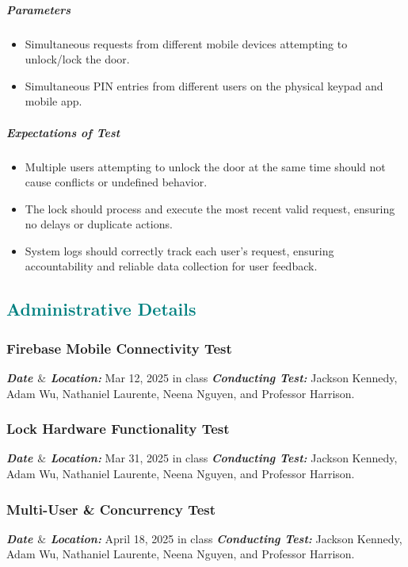 \subparagraph{Parameters}
\begin{itemize}
    \item Simultaneous requests from different mobile devices attempting to unlock/lock the door.
    \item Simultaneous PIN entries from different users on the physical keypad and mobile app.
\end{itemize}

\subparagraph{Expectations of Test}
\begin{itemize}
    \item Multiple users attempting to unlock the door at the same time should not cause conflicts or undefined behavior.
    \item The lock should process and execute the most recent valid request, ensuring no delays or duplicate actions.
    \item System logs should correctly track each user’s request, ensuring accountability and reliable data collection for user feedback.
\end{itemize}
\newpage

\textcolor{teal}{\subsection*{Administrative Details}}

\subsubsection{Firebase Mobile Connectivity Test}
\textbf{\textit{Date $\&$ Location:}} Mar 12, 2025 in class
\newline
\textbf{\textit{Conducting Test:}} Jackson Kennedy, Adam Wu, Nathaniel Laurente, Neena Nguyen, and Professor Harrison.

\subsubsection{Lock Hardware Functionality Test}
\textbf{\textit{Date $\&$ Location:}} Mar 31, 2025 in class
\newline
\textbf{\textit{Conducting Test:}} Jackson Kennedy, Adam Wu, Nathaniel Laurente, Neena Nguyen, and Professor Harrison.

\subsubsection{Multi-User \& Concurrency Test}
\textbf{\textit{Date $\&$ Location:}} April 18, 2025 in class
\newline
\textbf{\textit{Conducting Test:}} Jackson Kennedy, Adam Wu, Nathaniel Laurente, Neena Nguyen, and Professor Harrison.

